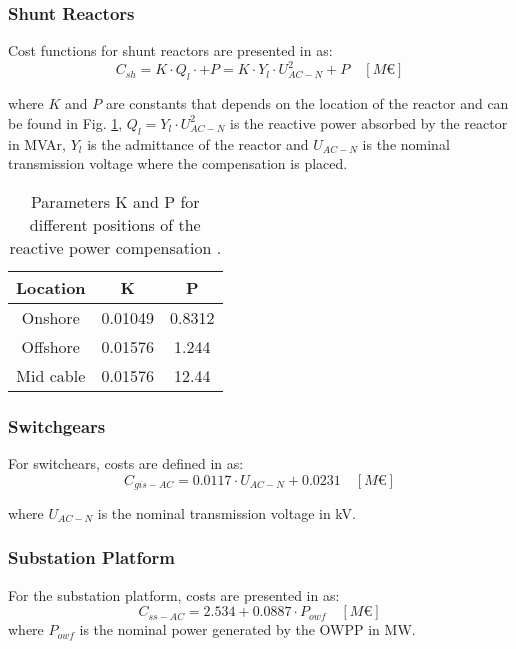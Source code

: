 \documentclass[a4paper,11pt, titlepage, twoside]{article}
\begin{document}
\subsubsection{Shunt Reactors}
Cost functions for shunt reactors are presented in \cite{paperbase} as:
\begin{equation}\label{eq:shuntcost}
    C_{sh}= K \cdot Q_l \cdot + P = K \cdot Y_l\cdot U_{AC-N}^2 + P \quad \left[M\euro\right]
\end{equation}

where $K$ and $P$ are constants that depends on the location of the reactor and can be found in Fig. \ref{tab:parametersshunt}, $Q_l = Y_l\cdot U_{AC-N}^2$ is the reactive power absorbed by the reactor in MVAr,
$Y_l$ is the admittance of the reactor and $U_{AC-N}$ is the nominal transmission voltage where the compensation is placed.


\begin{table}[H]
    \centering
    \begin{tabular}{c|c|c}
    \hline
    \textbf{Location} & \textbf{K} & \textbf{P} \\
    \hline
    Onshore & 0.01049 & 0.8312  \\
    Offshore & 0.01576 & 1.244 \\
    Mid cable & 0.01576 & 12.44 \\
    \hline
    \end{tabular}
    \caption{Parameters K and P for different positions of the reactive power compensation \cite{paperbase}.}
    \label{tab:parametersshunt}
    \end{table}
\subsubsection{Switchgears}

For switchears, costs are defined in \cite{switchcost} as:
\begin{equation}
    C_{gis-AC} = 0.0117 \cdot U_{AC-N} + 0.0231 \quad \left[M\euro\right]
\end{equation}

where $U_{AC-N}$ is the nominal transmission voltage in kV.
\subsubsection{Substation Platform}
For the substation platform, costs are presented in \cite{chalmers} as:
\begin{equation}
    C_{ss-AC} = 2.534 + 0.0887 \cdot P_{owf} \quad \left[M\euro\right]
\end{equation}
where $P_{owf}$ is the nominal power generated by the OWPP in MW.
\end{document}
